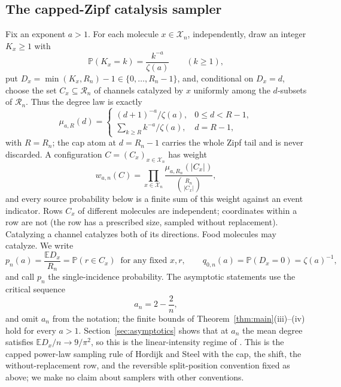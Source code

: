 \documentclass[11pt,letterpaper]{article}
\theoremstyle{plain}
\theoremstyle{definition}
\theoremstyle{remark}
\numberwithin{equation}{section}
\newcommand{\PP}{\mathbb P}
\newcommand{\EE}{\mathbb E}
\newcommand{\XX}{\mathcal X}
\newcommand{\RR}{\mathcal R}
\begin{document}
\subsection{The capped-Zipf catalysis sampler}\label{sec:sampler}
Fix an exponent $a>1$. For each molecule $x\in\XX_n$, independently, draw an integer $K_x\ge1$ with
\begin{equation}\label{eq:zipf}
 \PP(K_x=k)=\frac{k^{-a}}{\zeta(a)}\qquad(k\ge1),
\end{equation}
put $D_x=\min(K_x,R_n)-1\in\{0,\dots,R_n-1\}$, and, conditional on $D_x=d$, choose the set $C_x\subseteq\RR_n$ of channels catalyzed by $x$ uniformly among the $d$-subsets of $\RR_n$. Thus the degree law is exactly
\begin{equation}\label{eq:degreelaw}
 \mu_{a,R}(d)=\begin{cases}(d+1)^{-a}/\zeta(a),&0\le d<R-1,\\[2pt]
 \sum_{k\ge R}k^{-a}/\zeta(a),&d=R-1,\end{cases}
\end{equation}
with $R=R_n$; the cap atom at $d=R_n-1$ carries the whole Zipf tail and is never discarded. A configuration $C=(C_x)_{x\in\XX_n}$ has weight
\begin{equation}\label{eq:weight}
 w_{a,n}(C)=\prod_{x\in\XX_n}\frac{\mu_{a,R_n}(|C_x|)}{\binom{R_n}{|C_x|}},
\end{equation}
and every source probability below is a finite sum of this weight against an event indicator. Rows $C_x$ of different molecules are independent; coordinates within a row are not (the row has a prescribed size, sampled without replacement). Catalyzing a channel catalyzes both of its directions. Food molecules may catalyze. We write
\begin{equation}\label{eq:marginal}
 p_n(a)=\frac{\EE D_x}{R_n}=\PP(r\in C_x)\ \text{ for any fixed }x,r,\qquad
 q_{0,n}(a)=\PP(D_x=0)=\zeta(a)^{-1},
\end{equation}
and call $p_n$ the single-incidence probability. The asymptotic statements use the critical sequence
\begin{equation}\label{eq:an}
 a_n=2-\frac2n ,
\end{equation}
and omit $a_n$ from the notation; the finite bounds of Theorem~\ref{thm:main}(iii)--(iv) hold for every $a>1$. Section~\ref{sec:asymptotics} shows that at $a_n$ the mean degree satisfies $\EE D_x/n\to9/\pi^2$, so this is the linear-intensity regime of \cite{mossel2005random,hordijk2011required}. This is the capped power-law sampling rule of Hordijk and Steel \cite{hordijk2016variable} with the cap, the shift, the without-replacement row, and the reversible split-position convention fixed as above; we make no claim about samplers with other conventions.
\end{document}
